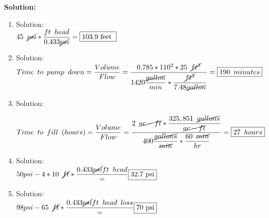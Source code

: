 \textbf{Solution:}
\begin{enumerate}

 \item Solution:\\ 
 \vspace{0.2cm}
$
45 \enspace \cancel{psi}*\dfrac{ft \enspace head}{0.433\cancel{psi}}=\boxed{103.9 \text { feet }}
$
 
 \vspace{0.2cm}
 
  \item Solution:\\
  
  $Time \enspace to \enspace pump \enspace down= \dfrac{Volume}{Flow}=\dfrac{0.785*110^2*25 \enspace \cancel{ft^3}}{1420\dfrac{\cancel{gallon}}{min}*\dfrac{\cancel{ft^3}}{7.48\cancel{gallon}}}=\boxed{190 \enspace minutes}$
 
 \vspace{0.2cm}

 \item Solution:\\
 
 \vspace{0.2cm}
 
 $Time \enspace to \enspace fill \enspace(hours)= \dfrac{Volume}{Flow}=\dfrac{2 \enspace \cancel{ac-ft}*\dfrac{325,851 \enspace \cancel{gallons}}{\cancel{ac-ft}}}{400 \dfrac{\cancel{gallons}}{\cancel{min}}*\dfrac{60 \enspace\cancel{ min}}{hr}}=\boxed{27 \enspace hours}$
 

 \item Solution:\\ 
 \vspace{0.2cm}
$
50 psi - 4*10 \enspace \cancel{ft}*\dfrac{0.433\cancel{psi}{ft \enspace head}}=\boxed{32.7 \text { psi}}
$


 \item Solution:\\ 
 \vspace{0.2cm}
$
98 psi - 65 \enspace \cancel{ft}*\dfrac{0.433\cancel{psi}{ft \enspace head \enspace loss}}=\boxed{70 \text { psi}}
$

\end{enumerate}



